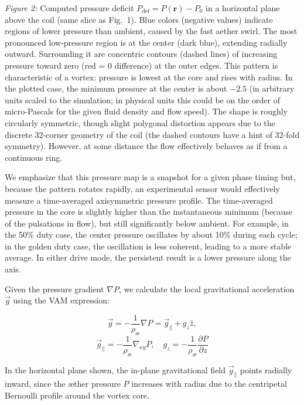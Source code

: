 \documentclass[twocolumn,aps,pre,floatfix,nofootinbib]{revtex4-2}
\begin{document}

\textit{Figure 2:} Computed pressure deficit $P_{\text{def}} = P(\mathbf{r}) - P_0$ in a horizontal plane above the coil (same slice as Fig.~1). Blue colors (negative values) indicate regions of lower pressure than ambient, caused by the fast aether swirl. The most pronounced low-pressure region is at the center (dark blue), extending radially outward. Surrounding it are concentric contours (dashed lines) of increasing pressure toward zero (red = 0 difference) at the outer edges. This pattern is characteristic of a vortex: pressure is lowest at the core and rises with radius. In the plotted case, the minimum pressure at the center is about $-2.5$ (in arbitrary units scaled to the simulation; in physical units this could be on the order of micro-Pascals for the given fluid density and flow speed). The shape is roughly circularly symmetric, though slight polygonal distortion appears due to the discrete 32-corner geometry of the coil (the dashed contours have a hint of 32-fold symmetry). However, at some distance the flow effectively behaves as if from a continuous ring.



We emphasize that this pressure map is a snapshot for a given phase timing but, because the pattern rotates rapidly, an experimental sensor would effectively measure a time-averaged axisymmetric pressure profile. The time-averaged pressure in the core is slightly higher than the instantaneous minimum (because of the pulsations in flow), but still significantly below ambient. For example, in the 50\% duty case, the center pressure oscillates by about 10\% during each cycle; in the golden duty case, the oscillation is less coherent, leading to a more stable average. In either drive mode, the persistent result is a lower pressure along the axis.

Given the pressure gradient \( \nabla P \), we calculate the local gravitational acceleration \( \vec{g} \) using the VAM expression:

\[
    \vec{g} = -\frac{1}{\rho_\text{\ae}} \nabla P = \vec{g}_\parallel + g_z \hat{z},
\]
\[
    \vec{g}_\parallel = -\frac{1}{\rho_\text{\ae}} \nabla_{xy} P, \quad g_z = -\frac{1}{\rho_\text{\ae}} \frac{\partial P}{\partial z}
\]

In the horizontal plane shown, the in-plane gravitational field \( \vec{g}_\parallel \) points radially inward, since the æther pressure \( P \) increases with radius due to the centripetal Bernoulli profile around the vortex core.
\end{document}

